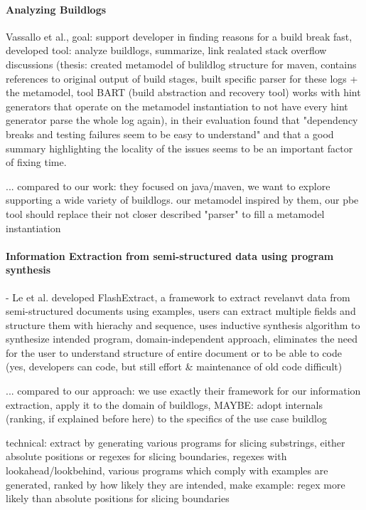 \documentclass[\myrootdir/main.tex]{subfiles}
\begin{document}
\paragraph{Analyzing Buildlogs}
Vassallo et al., goal: support developer in finding reasons for a build break fast, developed tool: analyze buildlogs, summarize, link realated stack overflow discussions (thesis: created metamodel of bulildlog structure for maven, contains references to original output of build stages, built specific parser for these logs + the metamodel, tool BART (build abstraction and recovery tool) works with hint generators that operate on the metamodel instantiation to not have every hint generator parse the whole log again), in their evaluation found that "dependency breaks and testing failures seem to be easy to understand" and that a good summary highlighting the locality of the issues seems to be an important factor of fixing time. \cite{vassallo2018un-break}

... compared to our work: they focused on java/maven, we want to explore supporting a wide variety of buildlogs. our metamodel inspired by them, our pbe tool should replace their not closer described "parser" to fill a metamodel instantiation

\paragraph{Information Extraction from semi-structured data using program synthesis}
- Le et al. developed FlashExtract, a framework to extract revelanvt data from semi-structured documents using examples, users can extract multiple fields and structure them with hierachy and sequence, uses inductive synthesis algorithm to synthesize intended program, domain-independent approach, eliminates the need for the user to understand structure of entire document or to be able to code (yes, developers can code, but still effort \& maintenance of old code difficult)

... compared to our approach: we use exactly their framework for our information extraction, apply it to the domain of buildlogs, MAYBE: adopt internals (ranking, if explained before here) to the specifics of the use case buildlog 

technical: extract by generating various programs for slicing substrings, either absolute positions or regexes for slicing boundaries, regexes with lookahead/lookbehind, various programs which comply with examples are generated, ranked by how likely they are intended, make example: regex more likely than absolute positions for slicing boundaries
\end{document}
